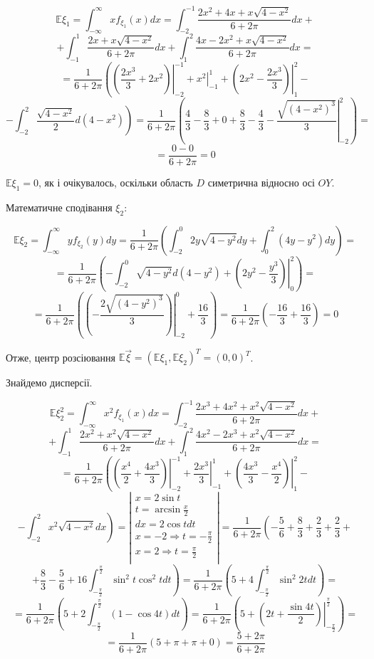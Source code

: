\documentclass[14pt, a4paper, ukrainian]{extreport}
\begin{document}
	$$\mathbb{E}\xi_1 = \int_{-\infty}^{\infty}xf_{\xi_1}(x)dx = \int_{-2}^{-1}\frac{2x^2 + 4x + x\sqrt{4-x^2}}{6+2\pi}dx +
	$$
	$$ + \int_{-1}^{1}\frac{2x + x\sqrt{4-x^2}}{6+2\pi}dx + \int_{1}^{2}\frac{4x-2x^2 + x\sqrt{4-x^2}}{6+2\pi}dx =
	$$
	$$ = \frac{1}{6+2\pi}\left(\left.\left(\frac{2x^3}{3} + 2x^2 \right)\right|_{-2}^{-1} + \left.{x^2}\right|_{-1}^{1} + \left.\left(2x^2 - \frac{2x^3}{3}\right)\right|_{1}^{2} - \right.$$
	$$ - \left.\int_{-2}^{2}\frac{\sqrt{4-x^2}}{2}d(4-x^2)\right) = 
	\frac{1}{6+2\pi} \left(\frac{4}{3} - \frac{8}{3} + 0 + \frac{8}{3} - \frac{4}{3} - \left. \frac{\sqrt{(4-x^2)^3}}{3}\right|_{-2}^2\right) =
	$$
	$$ = \frac{0 - 0}{6 + 2\pi} = 0
	$$
	
	$\mathbb{E}\xi_1 = 0$, як і очікувалось, оскільки область $D$ симетрична відносно осі $OY$.
	
	
	Математичне сподівання $\xi_2$:
	
	$$\mathbb{E}\xi_2 = \int_{-\infty}^{\infty}yf_{\xi_2}(y)dy =\frac{1}{6+2\pi}\left(\int_{-2}^{0}2y\sqrt{4-y^2}dy + \int_{0}^{2}(4y-y^2)dy\right) = 
	$$
	$$ = \frac{1}{6+2\pi}\left(-\int_{-2}^{0}\sqrt{4-y^2}d(4-y^2) + \left.\left(2y^2 - \frac{y^3}{3}\right)\right|_0^2\right) = 
	$$
	$$ = \frac{1}{6+2\pi}\left(\left.\left(-\frac{2\sqrt{(4-y^2)^3}}{3}\right)\right|_{-2}^0 + \frac{16}{3}\right) =
	 \frac{1}{6+2\pi}\left(-\frac{16}{3} + \frac{16}{3}\right) = 0
	$$
	
	Отже, центр розсіювання $\mathbb{E}\vec\xi = (\mathbb{E}\xi_1, \mathbb{E}\xi_2)^T = (0, 0)^T$.
	
	Знайдемо дисперсії.
	
	$$ \mathbb{E}\xi_2^2 = \int_{-\infty}^{\infty}x^2f_{\xi_1}(x)dx = \int_{-2}^{-1}\frac{2x^3 + 4x^2 + x^2\sqrt{4-x^2}}{6+2\pi}dx +
	$$
	$$ + \int_{-1}^{1}\frac{2x^2 + x^2\sqrt{4-x^2}}{6+2\pi}dx + \int_{1}^{2}\frac{4x^2-2x^3 + x^2\sqrt{4-x^2}}{6+2\pi}dx =
	$$
	$$ = \frac{1}{6+2\pi}\left(\left.\left(\frac{x^4}{2} + \frac{4x^3}{3} \right)\right|_{-2}^{-1} + \left.{\frac{2x^3}{3}}\right|_{-1}^{1} + \left.\left(\frac{4x^3}{3} - \frac{x^4}{2}\right)\right|_{1}^{2} - \right.$$
	$$ - \left.\int_{-2}^{2}x^2\sqrt{4-x^2}dx\right) = \left|
	\begin{matrix}
		x = 2\sin{t}\\
		t = \arcsin{\frac{x}{2}}\\
		dx = 2\cos{t}dt\\
		x = -2 \Rightarrow t = -\frac{\pi}{2}\\
		x = 2 \Rightarrow t = \frac{\pi}{2}\\
	\end{matrix}
	\right| = 
	\frac{1}{6+2\pi} \left(-\frac{5}{6} + \frac{8}{3} + \frac{2}{3} + \frac{2}{3} + \right.
	$$ 
	$$ + \frac{8}{3} - \frac{5}{6} + \left.16\int_{-\frac{\pi}{2}}^{\frac{\pi}{2}}\sin^2{t}\cos^2{t}dt \right) = \frac{1}{6+2\pi}\left(5 + 4 \int_{-\frac{\pi}{2}}^{\frac{\pi}{2}}\sin^2{2t}dt\right) =
	$$
	$$ = \frac{1}{6+2\pi}\left(5 + 2\int_{-\frac{\pi}{2}}^{\frac{\pi}{2}}(1 - \cos{4t})dt\right)
	 = \frac{1}{6+2\pi}\left(5 + \left.\left(2t + \frac{\sin{4t}}{2}\right)\right|_{-\frac{\pi}{2}}^{\frac{\pi}{2}}\right) =
	$$
	$$ = \frac{1}{6+2\pi}\left(5 + \pi + \pi + 0 \right) =
	 \frac{5 + 2\pi}{6+2\pi}
	$$
	
\end{document}
